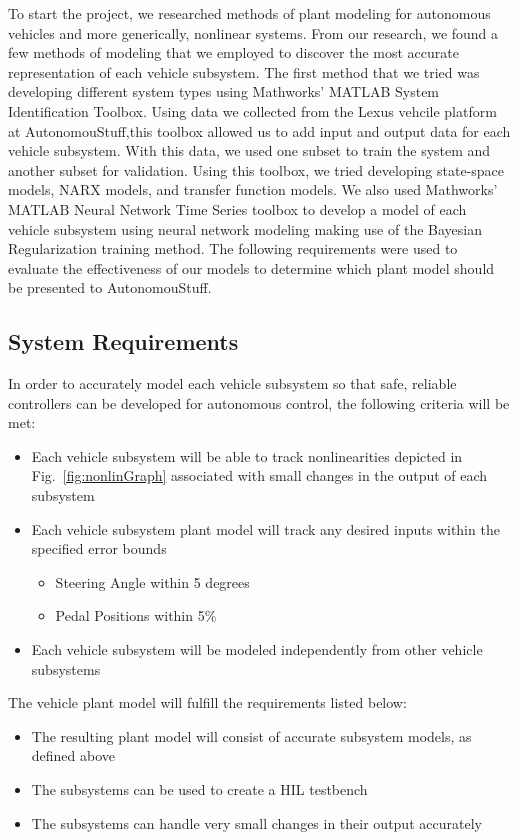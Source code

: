 \documentclass[journal,twoside,web]{ieeecolor}
\begin{document}
To start the project, we researched methods of plant modeling for autonomous vehicles and more generically, nonlinear systems. From our research, we found a few methods of modeling that we employed to discover the most accurate representation of each vehicle subsystem. The first method that we tried was developing different system types using Mathworks' MATLAB System Identification Toolbox. Using data we collected from the Lexus vehcile platform at AutonomouStuff,this toolbox allowed us to add input and output data for each vehicle subsystem. With this data, we used one subset to train the system and another subset for validation. Using this toolbox, we tried developing state-space models, NARX models, and transfer function models. We also used Mathworks' MATLAB Neural Network Time Series toolbox to develop a model of each vehicle subsystem using neural network modeling making use of the Bayesian Regularization training method. The following requirements were used to evaluate the effectiveness of our models to determine which plant model should be presented to AutonomouStuff.


\subsection{System Requirements}

In order to accurately model each vehicle subsystem so that safe, reliable controllers can be developed for autonomous control, the following criteria will be met:
\begin{itemize}
\item Each vehicle subsystem will be able to track nonlinearities depicted in Fig.~\ref{fig:nonlinGraph} associated with small changes in the output of each subsystem
\item Each vehicle subsystem plant model will track any desired inputs within the specified error bounds
	\begin{itemize}
		\item Steering Angle within 5 degrees
		\item Pedal Positions within 5\%
	\end{itemize}
\item Each vehicle subsystem will be modeled independently from other vehicle subsystems
\end{itemize}

The vehicle plant model will fulfill the requirements listed below:
\begin{itemize}
    \item The resulting plant model will consist of accurate subsystem models, as defined above
    \item The subsystems can be used to create a HIL testbench
    \item The subsystems can handle very small changes in their output accurately
\end{itemize}
\end{document}
